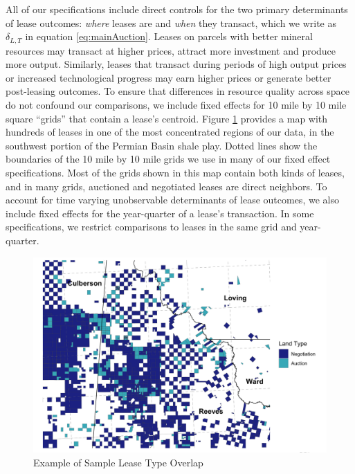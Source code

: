 \documentclass[12pt]{article}
\begin{document}
All of our specifications include direct controls for the two primary determinants of lease outcomes: \textit{where} leases are and \textit{when} they transact, which we write as $\delta_{L,T}$ in equation \ref{eq:mainAuction}. Leases on parcels with better mineral resources may transact at higher prices, attract more investment and produce more output. Similarly, leases that transact during periods of high output prices or increased technological progress may earn higher prices or generate better post-leasing outcomes. To ensure that differences in resource quality across space do not confound our comparisons, we include fixed effects for 10 mile by 10 mile square ``grids'' that contain a lease's centroid. Figure \ref{fig:RAL_overlap_map} provides a map with hundreds of leases in one of the most concentrated regions of our data, in the southwest portion of the Permian Basin shale play.  Dotted lines show the boundaries of the 10 mile by 10 mile grids we use in many of our fixed effect specifications. Most of the grids shown in this map contain both kinds of leases, and in many grids, auctioned and negotiated leases are direct neighbors. To account for time varying unobservable determinants of lease outcomes, we also include fixed effects for the year-quarter of a lease's transaction. In some specifications, we restrict comparisons to leases in the same grid and year-quarter. 

\begin{figure}[H]
	\begin{centering}
	\caption{Example of Sample Lease Type Overlap \label{fig:RAL_overlap_map}}
	\includegraphics[width=.9\textwidth]{../output/figures/sample_glo_leases.png}
	\par\end{centering}
\end{figure}
\end{document}
